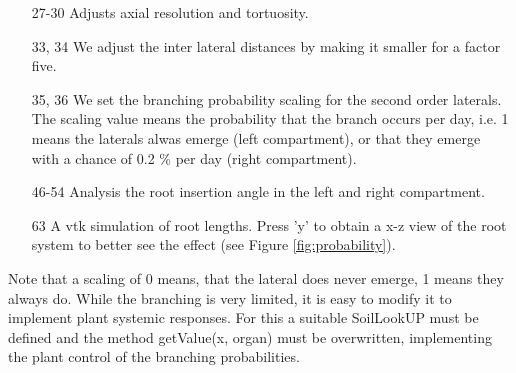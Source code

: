 \begin{itemize}


\item[27-30] Adjusts axial resolution and tortuosity.

\item[33, 34] We adjust the inter lateral distances by making it smaller for a factor five.

\item[35, 36] We set the branching probability scaling for the second order laterals. The scaling value means the probability that the branch occurs per day, i.e. 1 means the laterals alwas emerge (left compartment), or that they emerge with a chance of 0.2 \% per day (right compartment). 

\item[46-54] Analysis the root insertion angle in the left and right compartment. 

\item[63] A vtk simulation of root lengths. Press 'y' to obtain a x-z view of the root system to better see the effect (see Figure \ref{fig:probability}). 

\end{itemize}

Note that a scaling of 0 means, that the lateral does never emerge, 1 means they always do. While the branching is very limited, it is easy to modify it to implement plant systemic responses. For this a suitable SoilLookUP must be defined and the method getValue(x, organ) must be overwritten, implementing the plant control of the branching probabilities. 


